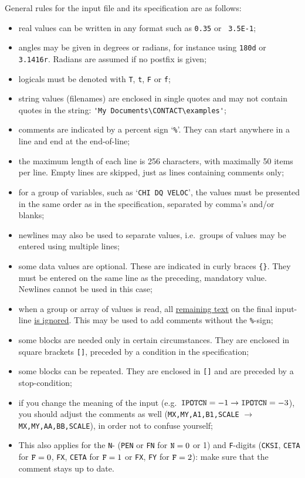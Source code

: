 \documentclass[12pt]{report}
\begin{document}
General rules for the input file and its specification are as follows:
\begin{itemize}
\item real values can be written in any format such as {\tt 0.35} or {\tt
        3.5E-1};
\item angles may be given in degrees or radians, for instance using
        {\tt 180d} or {\tt 3.1416r}. Radians are assumed if no postfix is
        given;
\item logicals must be denoted with {\tt T}, {\tt t}, {\tt F} or {\tt f};
\item string values (filenames) are enclosed in single quotes and may not
        contain quotes in the string: \verb+'My Documents\CONTACT\examples'+;
\item comments are indicated by a percent sign `{\tt \%}'. They can start
        anywhere in a line and end at the end-of-line;
\item the maximum length of each line is 256 characters, with maximally 50
        items per line. Empty lines are skipped, just as lines containing
        comments only;
\item for a group of variables, such as `{\tt CHI  DQ  VELOC}',
        the values must be presented in the same order as in the
        specification, separated by comma's and/or blanks;
\item newlines may also be used to separate values, i.e.\ groups of values
        may be entered using multiple lines;
\item some data values are optional. These are indicated in curly braces
        {\tt \{\}}. They must be entered on the same line as the preceding,
        mandatory value. Newlines cannot be used in this case;
\item when a group or array of values is read, all \underline{remaining text}
        on the final input-line \underline{is ignored}. This may be used to
        add comments without the {\tt \%}-sign;
\item some blocks are needed only in certain circumstances. They are
        enclosed in square brackets {\tt []}, preceded by a condition in
        the specification;
\item some blocks can be repeated. They are enclosed in {\tt []} and are
        preceded by a stop-condition;
\item if you change the meaning of the input (e.g.\ ${\tt IPOTCN}=-1
        \rightarrow {\tt IPOTCN}=-3$), you should adjust the comments as
        well ({\tt MX,MY,A1,B1,SCALE} $\rightarrow$ {\tt MX,MY,AA,BB,SCALE}),
        in order not to confuse yourself;
\item This also applies for the {\tt N}- ({\tt PEN} or {\tt FN} for
        ${\tt N}=0$ or 1) and {\tt F}-digits ({\tt CKSI}, {\tt CETA} for
        ${\tt F}=0$, {\tt FX}, {\tt CETA} for ${\tt F}=1$ or {\tt FX},
        {\tt FY} for ${\tt F}=2$): make sure that the comment stays up to
        date.
\end{itemize}
\end{document}
